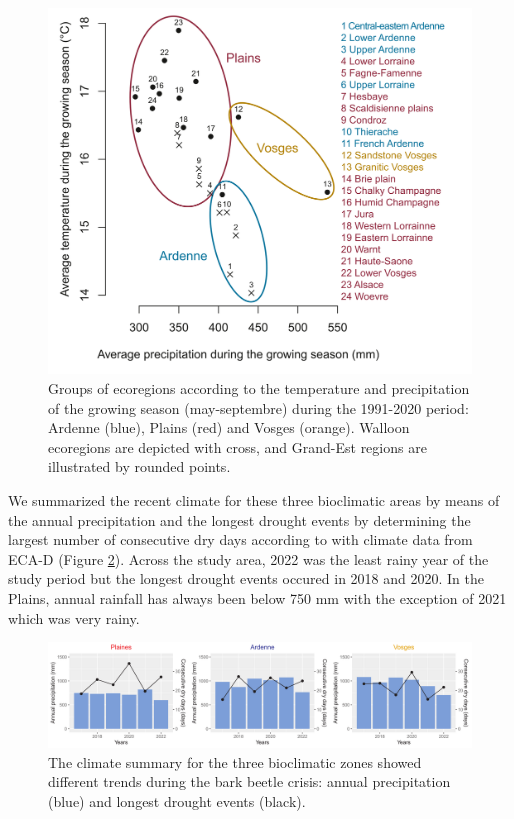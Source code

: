 \documentclass[3p,procedia]{elsarticle}
\begin{document}
\begin{figure}[htbp] 
	\centering
	\includegraphics[width=0.8\linewidth]{climat/climat_region.png}
	\caption{Groups of ecoregions according to the temperature and precipitation of the growing season (may-septembre) during the 1991-2020 period: Ardenne (blue), Plains (red) and Vosges (orange). Walloon ecoregions are depicted with cross, and Grand-Est regions are illustrated by rounded points.}
	\label{fig:clim}
\end{figure}

We summarized the recent climate for these three bioclimatic areas by means of the annual precipitation and the longest drought events by determining the largest number of consecutive dry days according to \cite{schulzweida_2015}  with climate data from ECA-D \citep{ecad} (Figure \ref{fig:climECAD}).
Across the study area, 2022 was the least rainy year of the study period but the longest drought events occured in 2018 and 2020.
In the Plains, annual rainfall has always been below 750 mm with the exception of 2021 which was very rainy.


\begin{figure}[htbp] 
	\centering

	\includegraphics[width=0.8\linewidth]{Sec_pluvio.png}


	\caption{The climate summary for the three bioclimatic zones showed different trends during the bark beetle crisis: annual precipitation (blue) and longest drought events (black).}
	\label{fig:climECAD}
\end{figure}
\end{document}
